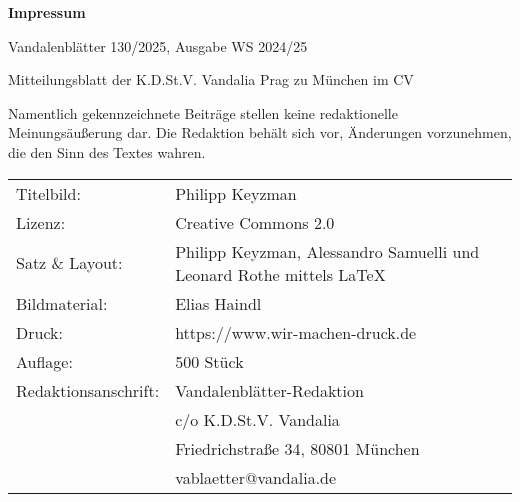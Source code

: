 \vspace*{7mm}
\begin{minipage}[h!]{160mm}
	\small{
		\textbf{Impressum}
		
		Vandalenblätter 130/2025, Ausgabe WS 2024/25
		
		Mitteilungsblatt der K.D.St.V. Vandalia Prag zu München im CV
		
		Namentlich gekennzeichnete Beiträge stellen keine redaktionelle Meinungsäußerung dar. Die Redaktion behält sich vor, Änderungen vorzunehmen, die den Sinn des Textes wahren.
		\\
		\newline
		\vspace{6pt}
		\noindent\begin{tabular}{ll}
			Titelbild: & Philipp Keyzman\\
			Lizenz: & Creative Commons 2.0 \\
			Satz \& Layout: & Philipp Keyzman, Alessandro Samuelli und Leonard Rothe mittels
			\LaTeX
			\\
			Bildmaterial: & Elias Haindl\\
			Druck: & https://www.wir-machen-druck.de\\
			Auflage: & 500 Stück\\
			Redaktionsanschrift: & Vandalenblätter-Redaktion \\	
			& c/o K.D.St.V. Vandalia\\
			& Friedrichstraße 34, 80801 München\\
			& vablaetter@vandalia.de
		\end{tabular}
	}
	
\end{minipage}
\clearpage
